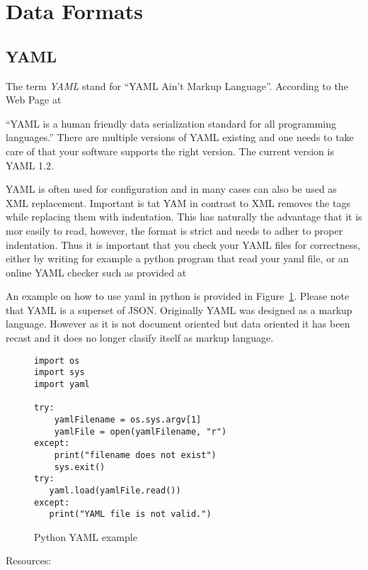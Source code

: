 \section{Data Formats}

\subsection{YAML}

The term \emph{YAML} stand for ``YAML Ain't Markup
Language''. According to the Web Page at 


``YAML is a human friendly data serialization standard for all
programming languages.'' There are multiple versions of YAML existing
and one needs to take care of that your software supports the right
version. The current version is YAML 1.2.

YAML is often used for configuration and in many cases can also be
used as XML replacement. Important is tat YAM in contrast to XML
removes the tags while replacing them with indentation. This has
naturally the advantage that it is mor easily to read, however, the
format is strict and needs to adher to proper indentation. Thus it is
important that you check your YAML files for correctness, either by
writing for example a python program that read your yaml file, or an
online YAML checker such as provided at 


An example on how to use yaml in python is provided in
Figure~\ref{F:yaml}. Please note that YAML is a superset of
JSON. Originally YAML was designed as a markup language. However as it
is not document oriented but data oriented it has been recast and it
does no longer clasify itself as markup language. 

\begin{figure}[htb]
\begin{lstlisting}
import os
import sys
import yaml

try:
    yamlFilename = os.sys.argv[1]
    yamlFile = open(yamlFilename, "r")
except:
    print("filename does not exist")
    sys.exit()
try:
   yaml.load(yamlFile.read())
except:
   print("YAML file is not valid.")
\end{lstlisting}
\caption{Python YAML example}\label{F:yaml}
\end{figure}

Resources: 



